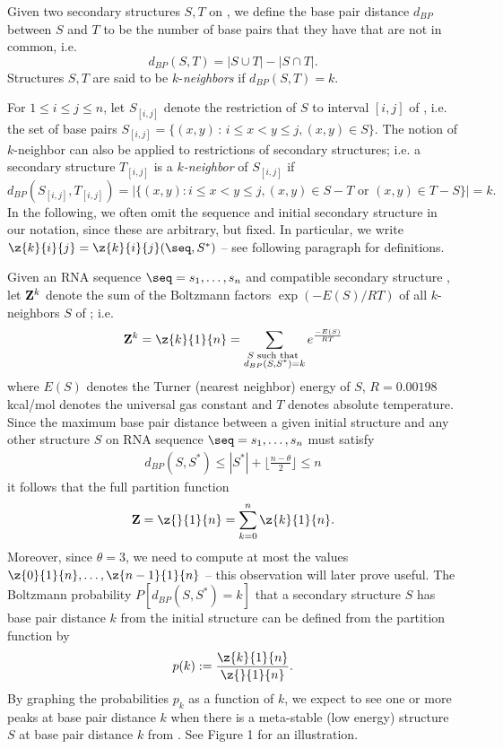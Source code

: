 Given two secondary structures $S,T$ on \seq, we
define the base pair distance $d_{BP}$ between $S$ and $T$
to be the number of base pairs that they have that are not in
common, i.e.
\begin{equation}
d_{BP}(S,T) = |S \cup T| - |S \cap T|.
\end{equation}
Structures $S,T$ are said to be $k$-{\em neighbors} if $d_{BP}(S,T) = k$.


For $1\leq i \leq j \leq n$, let
$S_{[i,j]}$ denote the restriction of $S$ to interval
$[i,j]$ of \seq, i.e. the set of base pairs
%
$S_{[i,j]} = \{ (x,y) \,:\, i \leq  x < y \leq j,  (x,y) \in S \}$.
%
The notion of $k$-neighbor can also be applied to restrictions of secondary
structures; i.e. a secondary structure $T_{[i,j]}$ is a
{\em $k$-neighbor} of $S_{[i,j]}$ if
\[
d_{BP}(S_{[i,j]},T_{[i,j]})= |\{ (x,y): i \leq x<y\leq j,
(x,y) \in S-T \mbox{ or } (x,y) \in T-S \}| = k.
\]
In the following,
we often omit the sequence \seq and initial secondary structure \strSt in our
notation, since these are arbitrary, but fixed.
In particular, we write $\z{k}{i}{j} = \z{k}{i}{j}(\seq,S^*)$ --
see following paragraph for definitions.


Given an RNA sequence $\seq=s_1,\ldots,s_n$ and compatible secondary structure
\strSt, let ${\bf Z}^k$ denote the sum
of the Boltzmann factors $\exp(-E(S)/RT)$ of all $k$-neighbors $S$ of  \strSt;
i.e.
\[
{\bf Z}^k = \z{k}{1}{n} =
\sum_{\substack{S \text{ such that }\\ d_{BP}(S,S^*)=k}}
e^{\frac{-E(S)}{RT}}
\]
where $E(S)$ denotes the Turner (nearest neighbor)
energy \cite{turner,xia:RNA}
of $S$, $R = 0.00198$ kcal/mol denotes the universal
gas constant and $T$ denotes absolute temperature.
Since the maximum base pair distance between a given initial
structure \strSt and any other structure $S$ on RNA sequence
$\seq = s_1,\ldots,s_n$ must satisfy
\begin{eqnarray}
\label{eq:upperBound}
d_{BP}(S,S^*) \leq |S^*| + \lfloor \frac{n-\theta}{2} \rfloor \leq n
\end{eqnarray}
it follows that the full partition function
\begin{eqnarray}
\label{eq:mcCaskillPartitionFun}
{\bf Z}=\z{}{1}{n} = \sum_{k=0}^n \z{k}{1}{n}.
\end{eqnarray}
Moreover, since $\theta=3$,
we need to compute at most the values
$\z{0}{1}{n},\ldots,\z{n-1}{1}{n}$ -- this observation will later prove useful.
The Boltzmann probability
$P[d_{BP}(S,S^*) = k]$
that a secondary structure $S$ has base pair distance $k$ from the initial
structure \strSt can be defined from the partition function by
\[
p(k) :=\frac{\z{k}{1}{n}}{\z{}{1}{n}}.
\]
By graphing the probabilities $p_k$ as a function of $k$,
we expect to see one or more peaks at base pair distance $k$ when
there is a meta-stable (low energy) structure $S$
at base pair distance $k$ from \strSt.
See Figure 1 for an illustration.

